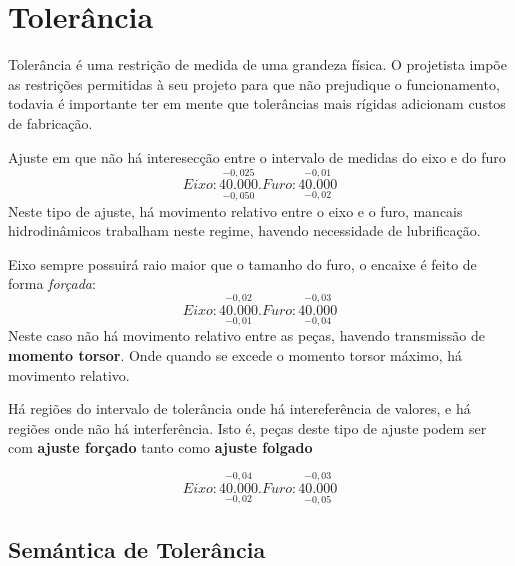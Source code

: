 \section{Tolerância}

Tolerância é uma restrição de medida de uma grandeza física. O projetista impõe as restrições permitidas à seu projeto para que não prejudique o funcionamento, todavia é importante ter em mente que tolerâncias mais rígidas adicionam custos de fabricação.

\begin{namedtheorem}
  Ajuste em que não há interesecção entre o intervalo de medidas do eixo e do furo
  \[\boxed{Eixo: \overset{-0,025}{\underset{-0,050}{40.000}}. Furo: \overset{-0,01}{\underset{-0,02}{40.000}}}\]
  Neste tipo de ajuste, há movimento relativo entre o eixo e o furo, mancais hidrodinâmicos trabalham neste regime, havendo necessidade de lubrificação.
\end{namedtheorem}

\begin{namedtheorem}
  Eixo sempre possuirá raio maior que o tamanho do furo, o encaixe é feito de forma \textit{forçada}: \\
   \[\boxed{Eixo: \overset{-0,02}{\underset{-0,01}{40.000}}. Furo: \overset{-0,03}{\underset{-0,04}{40.000}}}\]
  Neste caso não há movimento relativo entre as peças, havendo transmissão de \textbf{momento torsor}. Onde quando se excede o momento torsor máximo, há movimento relativo.
\end{namedtheorem}

\begin{namedtheorem}
  Há regiões do intervalo de tolerância onde há intereferência de valores, e há regiões onde não há interferência. Isto é, peças deste tipo de ajuste podem ser com \textbf{ajuste forçado} tanto como \textbf{ajuste folgado}
  
  \[\boxed{Eixo: \overset{-0,04}{\underset{-0,02}{40.000}}. Furo: \overset{-0,03}{\underset{-0,05}{40.000}}}\]
\end{namedtheorem}

\subsection{Semántica de Tolerância}

